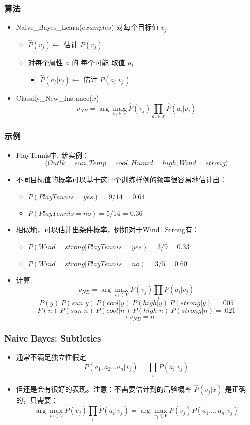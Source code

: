 \documentclass{beamer}
\begin{document}
\begin{frame}
\frametitle{算法}
\label{sec-8-3}


\begin{itemize}
\item Naive\_Bayes\_Learn($examples$)
  对每个目标值 $v_j$
\begin{itemize}
\item $\hat{P}(v_j) \leftarrow$ 估计 $P(v_j)$
\item 对每个属性 $a$ 的 每个可能 取值 $a_i$
\begin{itemize}
\item $\hat{P}(a_i|v_j) \leftarrow$ 估计 $P(a_i|v_j)$
\end{itemize}
\end{itemize}
\item Classify\_New\_Instance($x$)
  $$v_{NB} = \arg \max_{v_{j} \in V} \hat{P}(v_{j}) \prod_{a_i \in x} \hat{P}(a_{i} | v_{j})$$
\end{itemize}
\end{frame}
\begin{frame}
\frametitle{示例}
\label{sec-8-4}


\begin{itemize}
\item PlayTennis中, 新实例： 
  $$\langle Outlk=sun, Temp=cool, Humid=high, Wind=strong \rangle$$
\item 不同目标值的概率可以基于这14个训练样例的频率很容易地估计出：
\begin{itemize}
\item $P(PlayTennis=yes)=9/14=0.64$
\item $P(PlayTennis=no)=5/14=0.36$
\end{itemize}
\item 相似地，可以估计出条件概率，例如对于Wind=Strong有：
\begin{itemize}
\item $P(Wind=strong|PlayTennis=yes)=3/9=0.33$
\item $P(Wind=strong|PlayTennis=no)=3/5=0.60$
\end{itemize}
\item 计算:
    $$v_{NB} = \arg \max_{v_{j} \in V} P(v_{j}) \prod_{i} P(a_{i} | v_{j})$$
    \[P(y)\ P(sun|y)\ P(cool|y)\ P(high|y)\ P(strong|y) = .005 \]
    \[P(n)\ P(sun|n)\ P(cool|n)\ P(high|n)\ P(strong|n) = .021 \]
    \[ \rightarrow v_{NB} = n \]
\end{itemize}
\end{frame}
\begin{frame}
\frametitle{Naive Bayes: Subtleties}
\label{sec-8-5}

\begin{itemize}
\item 通常不满足独立性假定
    $$P(a_{1}, a_{2} \ldots a_{n}|v_{j}) = \prod_{i} P(a_{i} | v_{j})$$
\item 但还是会有很好的表现。注意：不需要估计到的后验概率 $\hat{P}(v_j|x)$ 是正确的，只需要：
    $$\arg\max_{v_{j}\in V}\hat{P}(v_{j})\prod_{i}\hat{P}(a_{i}|v_{j})=\arg\max_{v_{j} \in V}  P(v_{j}) P(a_{1} \ldots, a_n | v_{j})$$
\end{itemize}
\end{frame}
\end{document}
